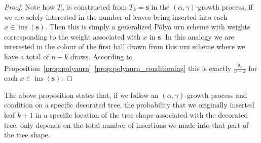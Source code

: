 \documentclass[a4paper, final]{amsart}
\theoremstyle{plain}
\theoremstyle{definition}
\newcommand{\tree}[1][t]{\boldsymbol{#1}}
\DeclareMathOperator{\insertable}{ins}
\newcommand{\insertablef}[1][\tree]{\insertable({\tree[#1]})}
\begin{document}
%
\begin{proof}
  Note how $T_n$ is constructed from ${T_k = \tree[s]}$ in the $(\alpha, \gamma)$-growth process, if we are solely interested in the number of leaves being inserted into each $x \in \insertablef[s]$.
  Then this is simply a generalized P\'{o}lya urn scheme with weights corresponding to the weight associated with $x$ in $\tree[s]$.
  In this analogy we are interested in the colour of the first ball drawn from this urn scheme where we have a total of $n-k$ draws.
  According to Proposition~\ref{prop:polyaurn}~\ref{prop:polyaurn_conditioning} this is exactly $\frac{\tilde{y}_x}{n-k}$ for each $x \in \insertablef[s]$.
\end{proof}
%
The above proposition states that, if we follow an $(\alpha, \gamma)$-growth process and condition on a specific decorated tree, the probability that we originally inserted leaf $k+1$ in a specific location of the tree shape associated with the decorated tree, only depends on the total number of insertions we made into that part of the tree shape.
%
\end{document}
